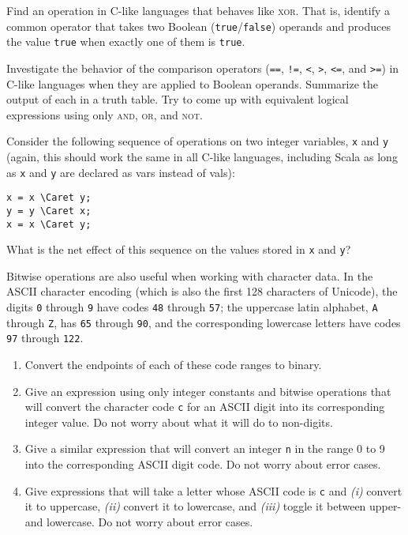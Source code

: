 \begin{exercises}
\item Find an operation in C-like languages that behaves like \textsc{xor}. That is, identify a common operator that takes two Boolean (\verb|true|/\verb|false|) operands and produces the value \verb|true| when exactly one of them is \verb|true|.

\item\label{ex:cmpop} Investigate the behavior of the comparison operators (\verb|==|, \verb|!=|, \verb|<|, \verb|>|, \verb|<=|, and \verb|>=|) in C-like languages when they are applied to Boolean operands. Summarize the output of each in a truth table. Try to come up with equivalent logical expressions using only \textsc{and}, \textsc{or}, and \textsc{not}.

\item Consider the following sequence of operations on two integer variables, \verb|x| and \verb|y| (again, this should work the same in all C-like languages, including Scala as long as \verb|x| and \verb|y| are declared as vars instead of vals):
\begin{Verbatim}
x = x \Caret y;
y = y \Caret x;
x = x \Caret y;
\end{Verbatim}
What is the net effect of this sequence on the values stored in \verb|x| and \verb|y|?

\item Bitwise operations are also useful when working with character data. In the ASCII character encoding (which is also the first 128 characters of Unicode), the digits \verb|0| through \verb|9| have codes \verb|48| through \verb|57|; the uppercase latin alphabet, \verb|A| through \verb|Z|, has \verb|65| through \verb|90|, and the corresponding lowercase letters have codes \verb|97| through \verb|122|.
\begin{enumerate}
\item Convert the endpoints of each of these code ranges to binary.
\item Give an expression using only integer constants and bitwise operations that will convert the character code \verb|c| for an ASCII digit into its corresponding integer value. Do not worry about what it will do to non-digits.
\item Give a similar expression that will convert an integer \verb|n| in the range 0 to 9 into the corresponding ASCII digit code. Do not worry about error cases.
\item Give expressions that will take a letter whose ASCII code is \verb|c| and \textit{(i)} convert it to uppercase, \textit{(ii)} convert it to lowercase, and \textit{(iii)} toggle it between upper- and lowercase. Do not worry about error cases.
\end{enumerate}
\end{exercises}

